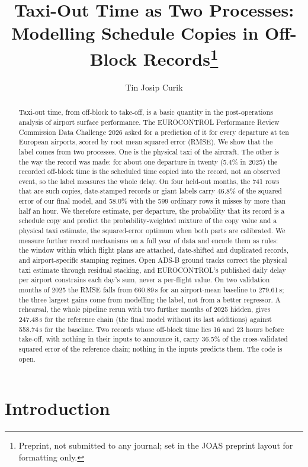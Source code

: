 \documentclass[
  manuscript=article,
  layout=preprint,
  year=2026,
  volume=x,
]{extra/joas}
\title{Taxi-Out Time as Two Processes: Modelling Schedule Copies in Off-Block Records\footnote{Preprint, not submitted to any journal; set in the JOAS preprint layout for formatting only.}}
\author{Tin Josip Curik}
\begin{document}
\begin{abstract}
Taxi-out time, from off-block to take-off, is a basic quantity in the post-operations analysis of airport surface performance.
The EUROCONTROL Performance Review Commission Data Challenge 2026 asked for a prediction of it for every departure at ten European
airports, scored by root mean squared error (RMSE). We show that the label comes from two processes. One is the physical taxi of the
aircraft. The other is the way the record was made: for about one departure in twenty (5.4\% in 2025) the recorded off-block time is
the scheduled time copied into the record, not an observed event, so the label measures the whole delay. On four held-out months, the
741 rows that are such copies, date-stamped records or giant labels carry 46.8\% of the squared error of our final model, and 58.0\%
with the 599 ordinary rows it misses by more than half an hour. We therefore estimate, per departure, the probability that its record
is a schedule copy and predict the probability-weighted mixture of the copy value and a physical taxi estimate, the squared-error
optimum when both parts are calibrated. We measure further record mechanisms on a full year of data and encode them as rules: the
window within which flight plans are attached, date-shifted and duplicated records, and airport-specific stamping regimes. Open ADS-B
ground tracks correct the physical taxi estimate through residual stacking, and EUROCONTROL's published daily delay per airport
constrains each day's sum, never a per-flight value. On two validation months of 2025 the RMSE falls from 660.89\,s for an
airport-mean baseline to 279.61\,s; the three largest gains come from modelling the label, not from a better regressor. A rehearsal,
the whole pipeline rerun with two further months of 2025 hidden, gives 247.48\,s for the reference chain (the final model without its
last additions) against 558.74\,s for the baseline. Two records whose off-block time lies 16 and 23 hours before take-off, with
nothing in their inputs to announce it, carry 36.5\% of the cross-validated squared error of the reference chain; nothing in the
inputs predicts them. The code is open.
\end{abstract}


\section{Introduction}
\label{sec:intro}
\end{document}

